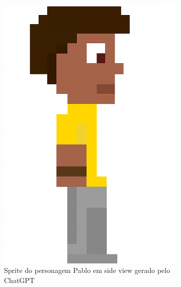 \begin{figure}[htbp]
\begin{subfigure}{0.22\linewidth}
        \includegraphics[width=1\linewidth]{figs/chatGPT/visao_lateral/res1.png}
        \caption{\small Sprite do personagem Pablo em side view gerado pelo ChatGPT}
        \label{fig:viduPabloChatGPTSide}
    \end{subfigure}
    \begin{subfigure}{0.22\linewidth}
        \centering

\end{subfigure}
\end{figure}
